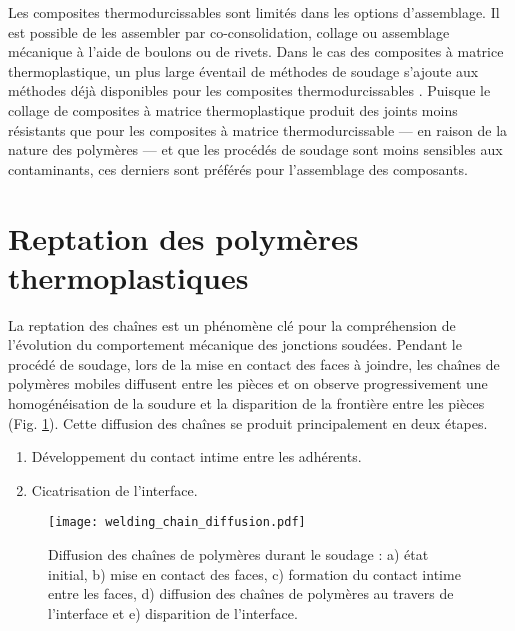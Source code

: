 Les composites thermodurcissables sont limités dans les options d'assemblage. 
Il est possible de les assembler par co-consolidation, collage ou assemblage mécanique à l'aide de boulons ou de rivets.
Dans le cas des composites à matrice thermoplastique, un plus large éventail de méthodes de soudage s'ajoute aux méthodes déjà disponibles pour les composites thermodurcissables \cite{campbell2003}. 
Puisque le collage de composites à matrice thermoplastique produit des joints moins résistants que pour les composites à matrice thermodurcissable --- en raison de la nature des polymères \cite{campbell2003} --- et que les procédés de soudage sont moins sensibles aux contaminants, ces derniers sont préférés pour l'assemblage des composants. 

\section{Reptation des polymères thermoplastiques}

La reptation des chaînes est un phénomène clé pour la compréhension de l'évolution du comportement mécanique des jonctions soudées. 
Pendant le procédé de soudage, lors de la mise en contact des faces à joindre, les chaînes de polymères mobiles diffusent entre les pièces et on observe progressivement une homogénéisation de la soudure et la disparition de la frontière entre les pièces (Fig. \ref{fig:polymer_diffusion}). 
Cette diffusion des chaînes se produit principalement en deux étapes. 
\begin{enumerate}
	\item Développement du contact intime entre les adhérents.
	\item Cicatrisation de l'interface.
\end{enumerate}

\begin{figure}[h]
	\centering
	\texttt{[image: welding\_chain\_diffusion.pdf]}
	\caption{Diffusion des chaînes de polymères durant le soudage : a) état initial, b) mise en contact des faces, c) formation du contact intime entre les faces, d) diffusion des chaînes de polymères au travers de l'interface et e) disparition de l'interface. }
	\label{fig:polymer_diffusion}
\end{figure}

